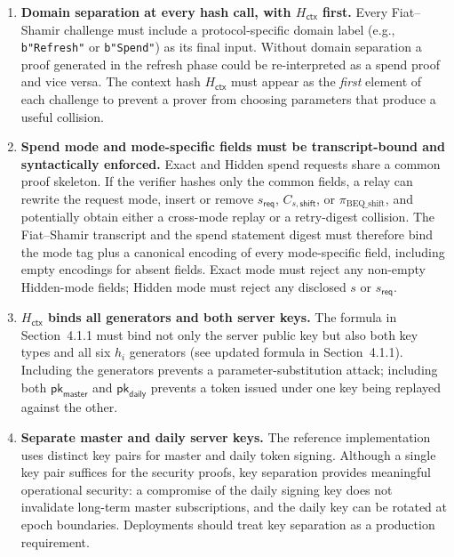 \documentclass[11pt]{article}
\theoremstyle{definitionstyle}
\theoremstyle{plain}
\begin{document}
\begin{enumerate}[leftmargin=*,label=\textbf{C\arabic*.}]
\item \textbf{Domain separation at every hash call, with $H_{\mathsf{ctx}}$ first.}
  Every Fiat--Shamir challenge must include a protocol-specific domain label
  (e.g., \texttt{b"Refresh"} or \texttt{b"Spend"}) as its final input.
  Without domain separation a proof generated in the refresh phase could be
  re-interpreted as a spend proof and vice versa.  The context hash
  $H_{\mathsf{ctx}}$ must appear as the \emph{first} element of each challenge
  to prevent a prover from choosing parameters that produce a useful collision.

\item \textbf{Spend mode and mode-specific fields must be transcript-bound and syntactically enforced.}
  Exact and Hidden spend requests share a common proof skeleton.  If the
  verifier hashes only the common fields, a relay can rewrite the request mode,
  insert or remove $s_{\mathsf{req}}$, $C_{s,\mathsf{shift}}$, or $\pi_{\text{BEQ\_shift}}$, and
  potentially obtain either a cross-mode replay or a retry-digest
  collision.  The Fiat--Shamir transcript and the spend statement digest must
  therefore bind the mode tag plus a canonical encoding of every mode-specific
  field, including empty encodings for absent fields.  Exact mode must reject
  any non-empty Hidden-mode fields; Hidden mode must reject any disclosed $s$
  or $s_{\mathsf{req}}$.

\item \textbf{$H_{\mathsf{ctx}}$ binds all generators and both server keys.}
  The formula in Section~4.1.1 must bind not only the server public key but
  also both key types and all six $h_i$ generators (see updated formula in
  Section~4.1.1).  Including the generators prevents a parameter-substitution
  attack; including both $\mathsf{pk}_{\mathsf{master}}$ and
  $\mathsf{pk}_{\mathsf{daily}}$ prevents a token issued under one key being
  replayed against the other.

\item \textbf{Separate master and daily server keys.}
  The reference implementation uses distinct key pairs for master and daily
  token signing.  Although a single key pair suffices for the security proofs,
  key separation provides meaningful operational security: a compromise of
  the daily signing key does not invalidate long-term master subscriptions,
  and the daily key can be rotated at epoch boundaries.  Deployments should
  treat key separation as a production requirement.

\end{enumerate}
\end{document}
